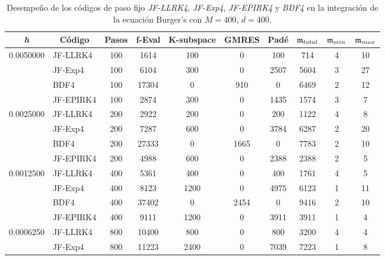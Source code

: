 \begin{table}
	\caption{Desempeño de los códigos de paso fijo \textit{JF-LLRK4}, \textit{JF-Exp4}, \textit{JF-EPIRK4} y \textit{BDF4} en la integración de la ecuación Burger's con $M=400$, $d=400$.}
	\centering
	\begin{adjustbox}{width=0.9\columnwidth,center}
		\begin{tabular}{cccccccccc}
			\hline
			\textit{h} & Código & Pasos & f-Eval & K-subspace & GMRES & Padé & $\mathfrak{m}_{total}$ & $\mf%
			_{min}$ & $\mathfrak{m}_{max}$ \\ \hline
			\multicolumn{1}{l}{0.0050000} & \multicolumn{1}{l}{JF-LLRK4} & 100 & 1614 &
			100 & 0 & 100 & 714 & 4 & 10 \\
			\multicolumn{1}{l}{} & \multicolumn{1}{l}{JF-Exp4} & 100 & 6104 & 300 & 0 &
			2507 & 5604 & 3 & 27 \\
			\multicolumn{1}{l}{} & \multicolumn{1}{l}{BDF4} & 100 & 17304 & 0 & 910 & 0
			& 6469 & 2 & 12 \\
			\multicolumn{1}{l}{} & \multicolumn{1}{l}{JF-EPIRK4} & 100 & 2874 & 300 & 0 &
			1435 & 1574 & 3 & 7 \\
			\multicolumn{1}{l}{0.0025000} & \multicolumn{1}{l}{JF-LLRK4} & 200 & 2922 &
			200 & 0 & 200 & 1122 & 4 & 8 \\
			\multicolumn{1}{l}{} & \multicolumn{1}{l}{JF-Exp4} & 200 & 7287 & 600 & 0 &
			3784 & 6287 & 2 & 20 \\
			\multicolumn{1}{l}{} & \multicolumn{1}{l}{BDF4} & 200 & 27333 & 0 & 1665 & 0
			& 7783 & 2 & 10 \\
			\multicolumn{1}{l}{} & \multicolumn{1}{l}{JF-EPIRK4} & 200 & 4988 & 600 & 0 &
			2388 & 2388 & 2 & 5 \\
			\multicolumn{1}{l}{0.0012500} & \multicolumn{1}{l}{JF-LLRK4} & 400 & 5361 &
			400 & 0 & 400 & 1761 & 4 & 5 \\
			\multicolumn{1}{l}{} & \multicolumn{1}{l}{JF-Exp4} & 400 & 8123 & 1200 & 0 &
			4975 & 6123 & 1 & 11 \\
			\multicolumn{1}{l}{} & \multicolumn{1}{l}{BDF4} & 400 & 37402 & 0 & 2454 & 0
			& 9416 & 2 & 10 \\
			\multicolumn{1}{l}{} & \multicolumn{1}{l}{JF-EPIRK4} & 400 & 9111 & 1200 & 0 &
			3911 & 3911 & 1 & 4 \\
			\multicolumn{1}{l}{0.0006250} & \multicolumn{1}{l}{JF-LLRK4} & 800 & 10400 &
			800 & 0 & 800 & 3200 & 4 & 4 \\
			\multicolumn{1}{l}{} & \multicolumn{1}{l}{JF-Exp4} & 800 & 11223 & 2400 & 0
			& 7039 & 7223 & 1 & 8 \\

\end{tabular}
\end{adjustbox}
\end{table}
